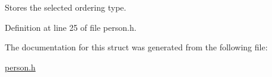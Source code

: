 Stores the selected ordering type. 



Definition at line 25 of file person.\+h.



The documentation for this struct was generated from the following file\+:\begin{DoxyCompactItemize}
\item 
\hyperlink{person_8h}{person.\+h}\end{DoxyCompactItemize}
